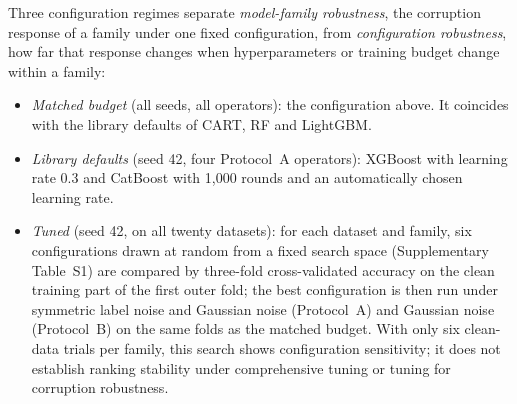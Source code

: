\documentclass[pdflatex,sn-mathphys]{sn-jnl}
\theoremstyle{thmstyleone}
\theoremstyle{thmstyletwo}
\theoremstyle{thmstylethree}
\begin{document}
Three configuration regimes separate \emph{model-family robustness}, the corruption response of a family under one fixed configuration, from \emph{configuration robustness}, how far that response changes when hyperparameters or training budget change within a family:
\begin{itemize}
\item \emph{Matched budget} (all seeds, all operators): the configuration above. It coincides with the library defaults of CART, RF and LightGBM.
\item \emph{Library defaults} (seed 42, four Protocol~A operators): XGBoost with learning rate $0.3$ and CatBoost with 1,000 rounds and an automatically chosen learning rate.
\item \emph{Tuned} (seed 42, on all twenty datasets): for each dataset and family, six configurations drawn at random from a fixed search space (Supplementary Table~S1) are compared by three-fold cross-validated accuracy on the clean training part of the first outer fold; the best configuration is then run under symmetric label noise and Gaussian noise (Protocol~A) and Gaussian noise (Protocol~B) on the same folds as the matched budget. With only six clean-data trials per family, this search shows configuration sensitivity; it does not establish ranking stability under comprehensive tuning or tuning for corruption robustness.
\end{itemize}
\end{document}
